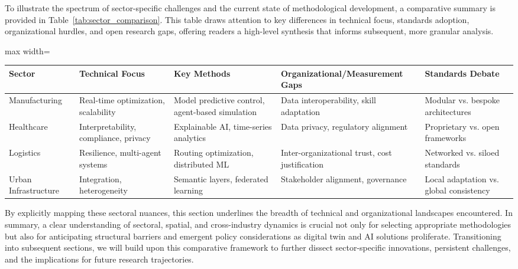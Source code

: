 \documentclass[sigconf]{acmart}
\begin{document}
To illustrate the spectrum of sector-specific challenges and the current state of methodological development, a comparative summary is provided in Table~\ref{tab:sector_comparison}. This table draws attention to key differences in technical focus, standards adoption, organizational hurdles, and open research gaps, offering readers a high-level synthesis that informs subsequent, more granular analysis.

\begin{table*}[htbp]
\centering
\caption{Comparative Summary of Sectoral Dynamics in Digital Twin and AI Integration}
\label{tab:sector_comparison}
\begin{adjustbox}{max width=\textwidth}
\begin{tabular}{@{}lllll@{}}
\toprule
Sector & Technical Focus & Key Methods & Organizational/Measurement Gaps & Standards Debate \\
\midrule
Manufacturing & Real-time optimization, scalability & Model predictive control, agent-based simulation & Data interoperability, skill adaptation & Modular vs. bespoke architectures \\
Healthcare & Interpretability, compliance, privacy & Explainable AI, time-series analytics & Data privacy, regulatory alignment & Proprietary vs. open frameworks \\
Logistics & Resilience, multi-agent systems & Routing optimization, distributed ML & Inter-organizational trust, cost justification & Networked vs. siloed standards \\
Urban Infrastructure & Integration, heterogeneity & Semantic layers, federated learning & Stakeholder alignment, governance & Local adaptation vs. global consistency \\
\bottomrule
\end{tabular}
\end{adjustbox}
\end{table*}

By explicitly mapping these sectoral nuances, this section underlines the breadth of technical and organizational landscapes encountered. In summary, a clear understanding of sectoral, spatial, and cross-industry dynamics is crucial not only for selecting appropriate methodologies but also for anticipating structural barriers and emergent policy considerations as digital twin and AI solutions proliferate. Transitioning into subsequent sections, we will build upon this comparative framework to further dissect sector-specific innovations, persistent challenges, and the implications for future research trajectories.
\end{document}
